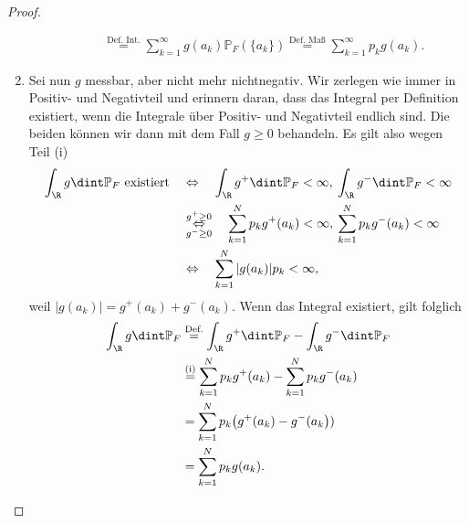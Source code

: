 \begin{proof}
\begin{enumerate}[label=(\roman*)]
\begin{enumerate}[label=(\alph*)]
\begin{align*}
			&\overset{\text{Def. Int.}}{=} \sum_{k = 1}^{\infty} g(a_k) \mathbb{P}_F(\{ a_k \}) \overset{\text{Def. Ma\ss}}{=} \sum_{k = 1}^{\infty} p_k g(a_k).
			\end{align*}
		\end{enumerate}
		\item Sei nun $g$ messbar, aber nicht mehr nichtnegativ. Wir zerlegen wie immer in Positiv- und Negativteil und erinnern daran, dass das Integral per Definition existiert, wenn die Integrale \"uber Positiv- und Negativteil endlich sind. Die beiden k\"onnen wir dann mit dem Fall $g\geq 0$ behandeln. Es gilt also wegen Teil (i)
		\begin{align*}
			\int_{\R} g \dint \mathbb P_F \text{ existiert} \quad& \Leftrightarrow \quad \int_{\R} g^+ \dint \mathbb{P}_F < \infty, \: \int_{\R} g^- \dint \mathbb{P}_F < \infty \\
			&\underset{g^- \geq 0}{\overset{g^+ \geq 0}{\Leftrightarrow}} \quad \sum_{k=1}^{N} p_kg^+(a_k) < \infty, \: \sum_{k=1}^{N} p_kg^-(a_k)< \infty\\
			& \Leftrightarrow\quad \sum_{k=1}^{N} |g(a_k)|p_k < \infty,
		\end{align*}
		weil $|g(a_k)| = g^+(a_k) + g^-(a_k)$.
		Wenn das Integral existiert, gilt folglich
		\begin{align*}
			\int_{\R} g \dint \mathbb{P}_F &\overset{\text{Def.}}{=} \int_{\R} g^+ \dint \mathbb{P}_F - \int_{\R} g^- \dint \mathbb{P}_F \\
			&\overset{\text{(i)}}{=} \sum_{k = 1}^{N} p_k g^+(a_k) - \sum_{k = 1}^{N} p_k g^-(a_k)\\
			&= \sum_{k = 1}^{N} p_k \big(g^+(a_k) - g^-(a_k\big))\\
			& = \sum_{k = 1}^{N} p_k g(a_k) .
		\end{align*}
	\end{enumerate}
\end{proof}

